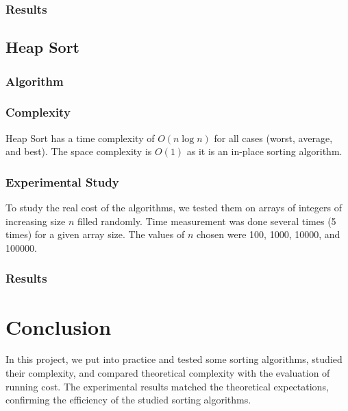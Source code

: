 \documentclass{article}
\begin{document}
\subsubsection{Results}
\begin{figure}[ht]
\end{figure}


\subsection{Heap Sort}

\subsubsection{Algorithm}

\subsubsection{Complexity}
Heap Sort has a time complexity of $O(n \log n)$ for all cases (worst, average, and best). The space complexity is $O(1)$ as it is an in-place sorting algorithm.

\subsubsection{Experimental Study}
To study the real cost of the algorithms, we tested them on arrays of integers of increasing size $n$ filled randomly. Time measurement was done several times (5 times) for a given array size. The values of $n$ chosen were 100, 1000, 10000, and 100000.

\subsubsection{Results}
\begin{figure}[ht]
\end{figure}

\section{Conclusion}
In this project, we put into practice and tested some sorting algorithms, studied their complexity, and compared theoretical complexity with the evaluation of running cost. The experimental results matched the theoretical expectations, confirming the efficiency of the studied sorting algorithms.
\end{document}
